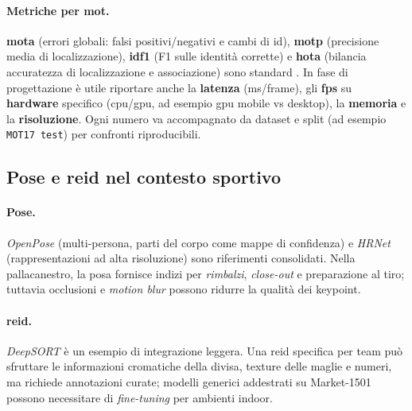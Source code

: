 \documentclass[12pt,a4paper,openright,twoside]{book}
\begin{document}
\paragraph{Metriche per \ac{mot}.} \textbf{\ac{mota}} (errori globali: falsi positivi/negativi e cambi di \ac{id}), 
\textbf{\ac{motp}} (precisione media di localizzazione), \textbf{\ac{idf1}} (F1 sulle identità corrette) e \textbf{\ac{hota}}
(bilancia accuratezza di localizzazione e associazione) sono standard
\cite{bernardin2008evaluating,ristani2016performance,luiten2021hota}. In fase di progettazione è utile riportare anche la \textbf{latenza} 
(ms/frame), gli \textbf{\ac{fps}} su \textbf{hardware} specifico (\ac{cpu}/\ac{gpu}, ad esempio \ac{gpu} mobile vs desktop), la \textbf{memoria} e la 
\textbf{risoluzione}. Ogni numero va accompagnato da dataset e split (ad esempio \texttt{MOT17 test}) per confronti riproducibili.

\subsection{Pose e \ac{reid} nel contesto sportivo}

\paragraph{Pose.} \textit{OpenPose} (multi-persona, parti del corpo come mappe di confidenza) \cite{cao2017realtime} e
\textit{HRNet} (rappresentazioni ad alta risoluzione) \cite{sun2019deep} sono riferimenti consolidati. Nella pallacanestro, 
la posa fornisce indizi per \emph{rimbalzi}, \emph{close-out} e preparazione al tiro; tuttavia occlusioni e \emph{motion blur}
possono ridurre la qualità dei keypoint.

\paragraph{\ac{reid}.} \textit{DeepSORT} è un esempio di integrazione leggera. Una \ac{reid} specifica per team può sfruttare 
le informazioni cromatiche della divisa, texture delle maglie e numeri, ma richiede annotazioni curate; modelli 
generici addestrati su Market-1501 \cite{zheng2015scalable} possono necessitare di \emph{fine-tuning} per ambienti indoor.
\end{document}
